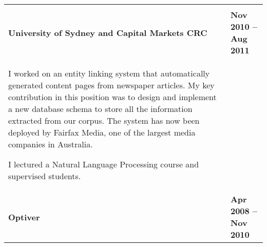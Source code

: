 \documentclass[]{article}
\begin{document}
\begin{table*}[h!]
\begin{tabular}[h!]{p{12.7cm}l}
& \\

\textbf{University of Sydney and Capital Markets CRC} & \textbf{Nov 2010 -- Aug 2011}\\

\vspace{0.05cm}
\hspace{0.5cm} I worked on an entity linking system that automatically generated content pages from newspaper articles. My key contribution in this position was to design and implement a new database schema to store all the information extracted from our corpus. The system has now been deployed by Fairfax Media, one of the largest media companies in Australia.

\hspace{0.5cm} I lectured a Natural Language Processing course and supervised students.



& \\

\textbf{Optiver} & \textbf{Apr 2008 -- Nov 2010}\\


\end{tabular}
\end{table*}
\end{document}
